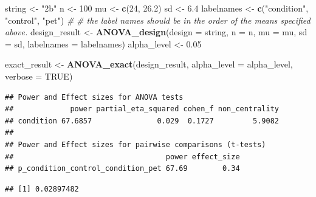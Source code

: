 \documentclass[
]{book}
\newenvironment{Shaded}{\begin{snugshade}}{\end{snugshade}}
\newcommand{\CommentTok}[1]{\textcolor[rgb]{0.56,0.35,0.01}{\textit{#1}}}
\newcommand{\DataTypeTok}[1]{\textcolor[rgb]{0.13,0.29,0.53}{#1}}
\newcommand{\DecValTok}[1]{\textcolor[rgb]{0.00,0.00,0.81}{#1}}
\newcommand{\FloatTok}[1]{\textcolor[rgb]{0.00,0.00,0.81}{#1}}
\newcommand{\KeywordTok}[1]{\textcolor[rgb]{0.13,0.29,0.53}{\textbf{#1}}}
\newcommand{\NormalTok}[1]{#1}
\newcommand{\OperatorTok}[1]{\textcolor[rgb]{0.81,0.36,0.00}{\textbf{#1}}}
\newcommand{\OtherTok}[1]{\textcolor[rgb]{0.56,0.35,0.01}{#1}}
\newcommand{\StringTok}[1]{\textcolor[rgb]{0.31,0.60,0.02}{#1}}
\begin{document}
\begin{Shaded}
\begin{Highlighting}[]
\NormalTok{string <-}\StringTok{ "2b"}
\NormalTok{n <-}\StringTok{ }\DecValTok{100}
\NormalTok{mu <-}\StringTok{ }\KeywordTok{c}\NormalTok{(}\DecValTok{24}\NormalTok{, }\FloatTok{26.2}\NormalTok{)}
\NormalTok{sd <-}\StringTok{ }\FloatTok{6.4}
\NormalTok{labelnames <-}\StringTok{ }\KeywordTok{c}\NormalTok{(}\StringTok{"condition"}\NormalTok{, }\StringTok{"control"}\NormalTok{, }\StringTok{"pet"}\NormalTok{) }\CommentTok{#}
\CommentTok{# the label names should be in the order of the means specified above.}
\NormalTok{design_result <-}\StringTok{ }\KeywordTok{ANOVA_design}\NormalTok{(}\DataTypeTok{design =}\NormalTok{ string,}
                              \DataTypeTok{n =}\NormalTok{ n,}
                              \DataTypeTok{mu =}\NormalTok{ mu,}
                              \DataTypeTok{sd =}\NormalTok{ sd,}
                              \DataTypeTok{labelnames =}\NormalTok{ labelnames)}
\NormalTok{alpha_level <-}\StringTok{ }\FloatTok{0.05}

\NormalTok{exact_result <-}\StringTok{ }\KeywordTok{ANOVA_exact}\NormalTok{(design_result,}
                            \DataTypeTok{alpha_level =}\NormalTok{ alpha_level,}
                            \DataTypeTok{verbose =} \OtherTok{TRUE}\NormalTok{)}
\end{Highlighting}
\end{Shaded}

\begin{verbatim}
## Power and Effect sizes for ANOVA tests
##             power partial_eta_squared cohen_f non_centrality
## condition 67.6857               0.029  0.1727         5.9082
## 
## Power and Effect sizes for pairwise comparisons (t-tests)
##                                   power effect_size
## p_condition_control_condition_pet 67.69        0.34
\end{verbatim}

\begin{Shaded}
\end{Shaded}

\begin{verbatim}
## [1] 0.02897482
\end{verbatim}

\begin{Shaded}
\end{Shaded}
\end{document}
